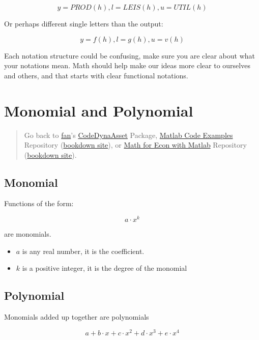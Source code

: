 \documentclass[
]{book}
\begin{document}
\[y=PROD(h),l=LEIS(h),u=UTIL(h)\]

Or perhaps different single letters than the output:

\[y=f(h),l=g(h),u=v(h)\]

Each notation structure could be confusing, make sure you are clear
about what your notations mean. Math should help make our ideas more
clear to ourselves and others, and that starts with clear functional
notations.

\hypertarget{monomial-and-polynomial}{%
\section{Monomial and Polynomial}\label{monomial-and-polynomial}}

\begin{quote}
Go back to \href{http://fanwangecon.github.io/}{fan}'s \href{https://fanwangecon.github.io/CodeDynaAsset/}{CodeDynaAsset} Package, \href{https://fanwangecon.github.io/M4Econ/}{Matlab Code Examples} Repository (\href{https://fanwangecon.github.io/M4Econ/bookdown}{bookdown site}), or \href{https://fanwangecon.github.io/Math4Econ/}{Math for Econ with Matlab} Repository (\href{https://fanwangecon.github.io/Math4Econ/bookdown}{bookdown site}).
\end{quote}

\hypertarget{monomial}{%
\subsection{Monomial}\label{monomial}}

Functions of the form:

\[a\cdot x^k\]

are monomials.

\begin{itemize}
\item
  \(a\) is any real number, it is the coefficient.
\item
  \(k\) is a positive integer, it is the degree of the monomial
\end{itemize}

\hypertarget{polynomial}{%
\subsection{Polynomial}\label{polynomial}}

Monomials added up together are polynomials

\[a+b\cdot x+c\cdot x^2 +d\cdot x^3 +e\cdot x^4\]
\end{document}
